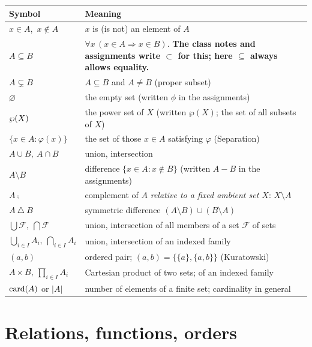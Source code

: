 \begin{longtable}{@{}p{3.6cm}p{11cm}@{}}
	\toprule
	\textbf{Symbol} & \textbf{Meaning}\\
	\midrule
	\endhead
	$x\in A$,\ $x\notin A$ & $x$ is (is not) an element of $A$\\
	$A\subseteq B$ & $\forall x\,(x\in A\Rightarrow x\in B)$. \textbf{The class notes and assignments write $\subset$ for this; here $\subseteq$ always allows equality.}\\
	$A\subsetneq B$ & $A\subseteq B$ and $A\neq B$ (proper subset)\\
	$\varnothing$ & the empty set (written $\phi$ in the assignments)\\
	$\wp(X)$ & the power set of $X$ (written $\wp(X)$; the set of all subsets of $X$)\\
	$\{x\in A : \varphi(x)\}$ & the set of those $x\in A$ satisfying $\varphi$ (Separation)\\
	$A\cup B,\ A\cap B$ & union, intersection\\
	$A\setminus B$ & difference $\{x\in A: x\notin B\}$ (written $A-B$ in the assignments)\\
	$A\comp$ & complement of $A$ \emph{relative to a fixed ambient set $X$}: $X\setminus A$\\
	$A\mathbin{\triangle} B$ & symmetric difference $(A\setminus B)\cup(B\setminus A)$\\
	$\bigcup\mathcal F,\ \bigcap\mathcal F$ & union, intersection of all members of a set $\mathcal F$ of sets\\
	$\bigcup_{i\in I}A_i,\ \bigcap_{i\in I}A_i$ & union, intersection of an indexed family\\
	$(a,b)$ & ordered pair; $(a,b)=\{\{a\},\{a,b\}\}$ (Kuratowski)\\
	$A\times B,\ \prod_{i\in I}A_i$ & Cartesian product of two sets; of an indexed family\\
	$\operatorname{card}(A)$ or $|A|$ & number of elements of a finite set; cardinality in general\\
	\bottomrule
\end{longtable}

\section*{Relations, functions, orders}

